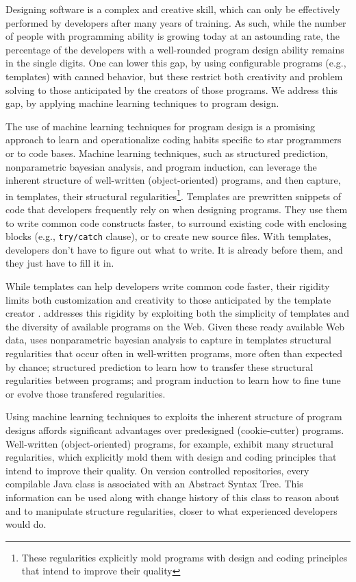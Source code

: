 Designing software is a complex and creative skill, which can 
only be effectively performed by developers after many years 
of training. As such, while the number of people with 
programming ability is growing today at an astounding rate, the 
percentage of the developers with a well-rounded program design 
ability remains in the single digits. One can lower this gap,
by using configurable programs (e.g., templates) with canned 
behavior, but these restrict both creativity and problem solving 
to those anticipated by the creators of those programs. We address 
this gap, by applying machine learning techniques to program 
design.

The use of machine learning techniques for program design is a 
promising approach to learn and operationalize coding habits 
specific to star programmers or to code bases. Machine learning 
techniques, such as structured prediction, nonparametric bayesian 
analysis, and program induction, can leverage the inherent structure 
of well-written (object-oriented) programs, and then capture, in 
templates, their structural regularities\footnote{These regularities 
explicitly mold programs with design and coding principles that 
intend to improve their quality}. Templates are prewritten snippets 
of code that developers frequently rely on when designing programs. 
They use them to write common code constructs faster, to surround 
existing code with enclosing blocks (e.g., \texttt{try/catch} clause), 
or to create new source files. With templates, developers don't have 
to figure out what to write. It is already before them, and they just 
have to fill it in.

While templates can help developers write common code faster, their 
rigidity limits both customization and creativity to those anticipated 
by the template creator \cite{Kumar2011-hy}. \pdm addresses this 
rigidity by exploiting both the simplicity of templates and the 
diversity of available programs on the Web. Given these ready available 
Web data, \pdm uses nonparametric bayesian analysis \cite{allamanis2014mining} 
to capture in templates structural regularities that occur often in 
well-written programs, more often than expected by chance; structured 
prediction \cite{collins2002discriminative} to learn how to transfer 
these structural regularities between programs; and program 
induction \cite{lake2015human} to learn how to fine tune or evolve 
those transfered regularities.

Using machine learning techniques to exploits the inherent structure of 
program designs affords significant advantages over predesigned (cookie-cutter) 
programs. Well-written (object-oriented) programs, for example, exhibit 
many structural regularities, which explicitly mold them with design 
and coding principles that intend to improve their quality. On version 
controlled repositories, every compilable Java class is associated with 
an Abstract Syntax Tree. This information can be used along with change 
history of this class to reason about and to manipulate structure 
regularities, closer to what experienced developers would do.

